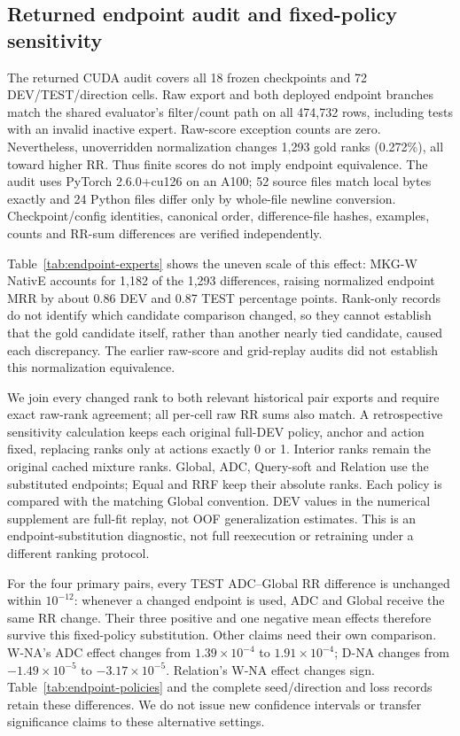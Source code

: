 \documentclass[11pt,a4paper]{article}
\begin{document}
\subsection{Returned endpoint audit and fixed-policy sensitivity}
\label{app:endpoint-review}
The returned CUDA audit covers all 18 frozen checkpoints and 72 DEV/TEST/direction cells. Raw export and both deployed endpoint branches match the shared evaluator's filter/count path on all 474,732 rows, including tests with an invalid inactive expert. Raw-score exception counts are zero. Nevertheless, unoverridden normalization changes 1,293 gold ranks (0.272\%), all toward higher RR. Thus finite scores do not imply endpoint equivalence. The audit uses PyTorch 2.6.0+cu126 on an A100; 52 source files match local bytes exactly and 24 Python files differ only by whole-file newline conversion. Checkpoint/config identities, canonical order, difference-file hashes, examples, counts and RR-sum differences are verified independently.



Table~\ref{tab:endpoint-experts} shows the uneven scale of this effect: MKG-W NativE accounts for 1,182 of the 1,293 differences, raising normalized endpoint MRR by about 0.86 DEV and 0.87 TEST percentage points. Rank-only records do not identify which candidate comparison changed, so they cannot establish that the gold candidate itself, rather than another nearly tied candidate, caused each discrepancy. The earlier raw-score and grid-replay audits did not establish this normalization equivalence.

We join every changed rank to both relevant historical pair exports and require exact raw-rank agreement; all per-cell raw RR sums also match. A retrospective sensitivity calculation keeps each original full-DEV policy, anchor and action fixed, replacing ranks only at actions exactly 0 or 1. Interior ranks remain the original cached mixture ranks. Global, ADC, Query-soft and Relation use the substituted endpoints; Equal and RRF keep their absolute ranks. Each policy is compared with the matching Global convention. DEV values in the numerical supplement are full-fit replay, not OOF generalization estimates. This is an endpoint-substitution diagnostic, not full reexecution or retraining under a different ranking protocol.



For the four primary pairs, every TEST ADC--Global RR difference is unchanged within $10^{-12}$: whenever a changed endpoint is used, ADC and Global receive the same RR change. Their three positive and one negative mean effects therefore survive this fixed-policy substitution. Other claims need their own comparison. W-NA's ADC effect changes from $1.39\times10^{-4}$ to $1.91\times10^{-4}$; D-NA changes from $-1.49\times10^{-5}$ to $-3.17\times10^{-5}$. Relation's W-NA effect changes sign. Table~\ref{tab:endpoint-policies} and the complete seed/direction and loss records retain these differences. We do not issue new confidence intervals or transfer significance claims to these alternative settings.
\end{document}
